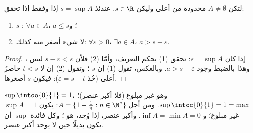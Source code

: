 \begin{proposition}\label{prop:b1:reals:epsilon}
لتكن $A \neq \emptyset$ محدودة من أعلى وليكن $s \in \R$. عندئذ $s =
\sup A$ إذا وفقط إذا تحقق:
\begin{enumerate}
  \item $s$ : $\forall a \in A$، $a \leq s$؛ و
  \item لا شيء أصغر منه كذلك: $\forall \varepsilon > 0$، $\exists a \in
        A$، $a > s - \varepsilon$.
\end{enumerate}
\end{proposition}

\begin{proof}
إذا كان $s = \sup A$: تحقق (1) بحكم التعريف، وأمّا (2) فلأن $s -
\varepsilon < s$ ليس ، وهذا بالضبط
وجود $a > s - \varepsilon$. وبالعكس، تقول (1) إن $s$ ؛ وتقول (2) إن لا $t < s$ حاصرٌ أعلى (خُذ $\varepsilon
= s - t$): فيكون $s$ أصغرها.
\end{proof}

\begin{example}\label{ex:b1:reals:supexamples}
$\sup \intoo{0}{1} = 1$، وهو غير مبلوغ (فلا أكبر عنصر)؛
$\sup \intcc{0}{1} = 1 = \max$. ومن أجل $A = \{1 - \frac 1n : n \in
\N^*\}$: يكون $\sup A = 1$ غير مبلوغ؛ و $\inf A = \min A = 0$. وأكبر عنصر،
إذا وُجد، هو ؛ وكل فائدة $\sup$ أن يكون
بديلًا حين لا يوجد أكبر عنصر.
\end{example}

